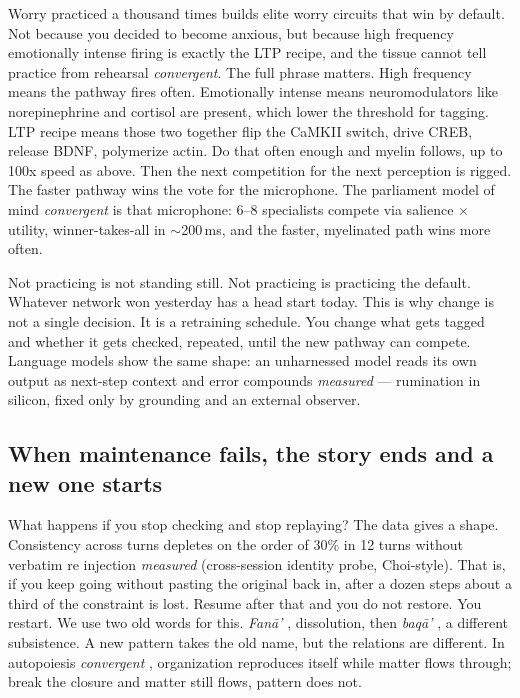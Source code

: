 Worry practiced a thousand times builds elite worry circuits that win by default. Not because you decided to become anxious, but because high frequency emotionally intense firing is exactly the LTP recipe, and the tissue cannot tell practice from rehearsal \textit{convergent}. The full phrase matters. High frequency means the pathway fires often. Emotionally intense means neuromodulators like norepinephrine and cortisol are present, which lower the threshold for tagging. LTP recipe means those two together flip the CaMKII switch, drive CREB, release BDNF, polymerize actin. Do that often enough and myelin follows, up to 100x speed as above. Then the next competition for the next perception is rigged. The faster pathway wins the vote for the microphone. The parliament model of mind \textit{convergent} \citep{baars1988,clark2016,seth2021} is that microphone: 6--8 specialists compete via salience $\times$ utility, winner-takes-all in $\sim$200\,ms, and the faster, myelinated path wins more often.

Not practicing is not standing still. Not practicing is practicing the default. Whatever network won yesterday has a head start today. This is why change is not a single decision. It is a retraining schedule. You change what gets tagged and whether it gets checked, repeated, until the new pathway can compete. Language models show the same shape: an unharnessed model reads its own output as next-step context and error compounds \textit{measured} --- rumination in silicon, fixed only by grounding and an external observer.

\subsection*{When maintenance fails, the story ends and a new one starts}

What happens if you stop checking and stop replaying? The data gives a shape. Consistency across turns depletes on the order of 30\% in 12 turns without verbatim re injection \textit{measured} (cross-session identity probe, Choi-style). That is, if you keep going without pasting the original back in, after a dozen steps about a third of the constraint is lost. Resume after that and you do not restore. You restart. We use two old words for this. \textit{Fan\={a}'} , dissolution, then \textit{baq\={a}'} , a different subsistence. A new pattern takes the old name, but the relations are different. In autopoiesis \textit{convergent} \citep{maturana1980}, organization reproduces itself while matter flows through; break the closure and matter still flows, pattern does not.

